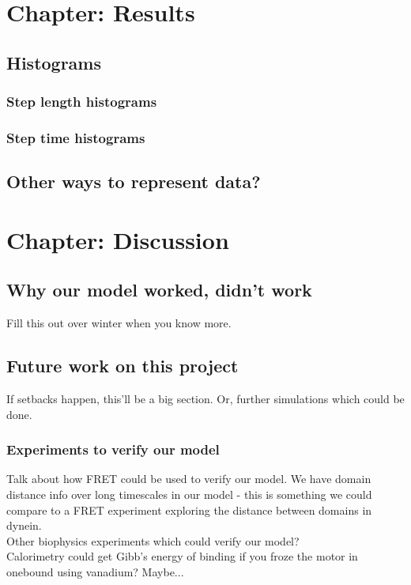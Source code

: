 \documentclass[10pt]{article} %
\begin{document}
\section{Chapter: Results}
	\subsection{Histograms}
		\subsubsection{Step length histograms}
		\subsubsection{Step time histograms}
	\subsection{Other ways to represent data?}

\section{Chapter: Discussion}
\subsection{Why our model worked, didn’t work}
Fill this out over winter when you know more.\\
\subsection{Future work on this project}
If setbacks happen, this'll be a big section. Or, further simulations which could be done.

\subsubsection{Experiments to verify our model}
Talk about how FRET could be used to verify our model. We have domain distance info over long
timescales in our model - this is something we could compare to a FRET experiment exploring
the distance between domains in dynein.\\

Other biophysics experiments which could verify our model?\\

Calorimetry could get Gibb's energy of binding if you froze the motor in onebound using
vanadium? Maybe...\\
\end{document}
